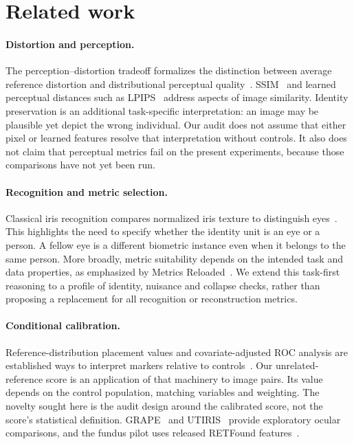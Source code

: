 \documentclass[10pt,twocolumn,letterpaper]{article}
\begin{document}
\section{Related work}
\paragraph{Distortion and perception.}
The perception--distortion tradeoff formalizes the distinction between average reference distortion and distributional perceptual quality~\cite{blau2018}. SSIM~\cite{wang2004} and learned perceptual distances such as LPIPS~\cite{zhang2018lpips} address aspects of image similarity. Identity preservation is an additional task-specific interpretation: an image may be plausible yet depict the wrong individual. Our audit does not assume that either pixel or learned features resolve that interpretation without controls. It also does not claim that perceptual metrics fail on the present experiments, because those comparisons have not yet been run.

\paragraph{Recognition and metric selection.}
Classical iris recognition compares normalized iris texture to distinguish eyes~\cite{daugman2004}. This highlights the need to specify whether the identity unit is an eye or a person. A fellow eye is a different biometric instance even when it belongs to the same person. More broadly, metric suitability depends on the intended task and data properties, as emphasized by Metrics Reloaded~\cite{maierhein2024}. We extend this task-first reasoning to a profile of identity, nuisance and collapse checks, rather than proposing a replacement for all recognition or reconstruction metrics.

\paragraph{Conditional calibration.}
Reference-distribution placement values and covariate-adjusted ROC analysis are established ways to interpret markers relative to controls~\cite{pepe2005,janes2009}. Our unrelated-reference score is an application of that machinery to image pairs. Its value depends on the control population, matching variables and weighting. The novelty sought here is the audit design around the calibrated score, not the score's statistical definition. GRAPE~\cite{huang2023grape} and UTIRIS~\cite{hosseini2010} provide exploratory ocular comparisons, and the fundus pilot uses released RETFound features~\cite{zhou2023retfound}.
\end{document}
